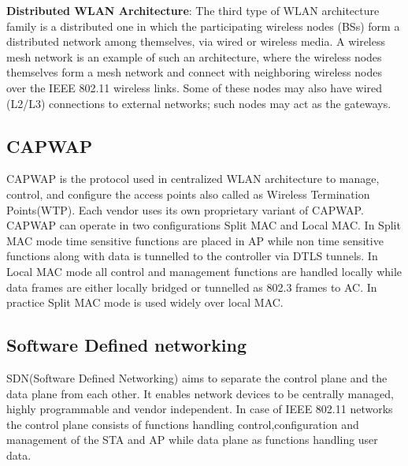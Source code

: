 \documentclass[12pt]{article}
\begin{document}
    \textbf{Distributed WLAN Architecture}: The third type of WLAN architecture family is a distributed one in which the participating wireless nodes (BSs) form a distributed network among themselves, via wired or wireless media. A wireless mesh network is an example of such an architecture, where the wireless nodes themselves form a mesh network and connect with neighboring wireless nodes over the IEEE 802.11 wireless links. Some of these nodes may also have wired (L2/L3) connections to external networks; such nodes may act as the gateways. 
    

	\subsection{CAPWAP}
	CAPWAP\cite{RFC5416} is the  protocol used in centralized WLAN architecture to manage, control, and configure the access points also called as Wireless Termination Points(WTP). Each vendor uses its own proprietary variant of CAPWAP. CAPWAP can operate in two configurations Split MAC and Local MAC. In Split MAC mode time sensitive functions are placed in AP while non time sensitive functions along with data is tunnelled to the controller via DTLS tunnels. In Local MAC mode all control and management functions are handled locally while data frames are either locally bridged or tunnelled as 802.3 frames to AC. In practice Split MAC mode is used widely over local MAC. 
	
	
    \subsection{Software Defined networking}
    SDN(Software Defined Networking) aims to separate the control plane and the data plane from each other. It enables network devices to be centrally managed, highly programmable and vendor independent.  In case of IEEE 802.11 networks the control plane consists of functions handling control,configuration and management of the STA and AP while data plane as functions handling user data. 
    
\end{document}
